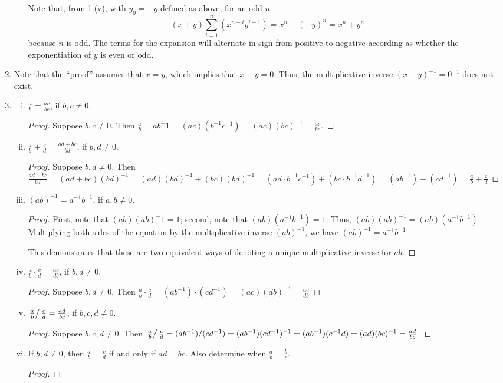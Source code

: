 \documentclass{amsart}
\begin{document}
\begin{enumerate}[1.]
\begin{enumerate}[(i)]
   Note that, from 1.(v), with $y_0=-y$ defined as above, for an odd $n$ $$(x+y)\sum_{i=1}^{n}(x^{n-i}y^{i-1})=x^n-(-y)^{n}=x^n+y^n$$ because $n$ is odd. The terms for the expansion will alternate in sign from positive to negative according as whether the exponentiation of $y$ is even or odd.
 \end{enumerate}
\item Note that the ``proof'' assumes that $x=y$, which implies that $x-y=0$. Thus, the multiplicative inverse $(x-y)^{-1}=0^{-1}$ does not exist.
\item
  \begin{enumerate}[(i)]
  \item  $ \frac{a}{b}=\frac{ac}{bc}$, if $b,c \neq 0$.
    \begin{proof}
      Suppose $b,c \neq 0$. Then $\frac{a}{b}=ab^-1=(ac)(b^{-1}c^{-1})=(ac)(bc)^{-1}=\frac{ac}{bc}$.
    \end{proof}
  \item $\frac{a}{b}+\frac{c}{d}=\frac{ad+bc}{bd}$, if $b,d \neq 0$.
  \begin{proof}
    Suppose $b,d\neq0$. Then $\frac{ad+bc}{bd}=(ad+bc)(bd)^{-1}=(ad)(bd)^{-1}+(bc)(bd)^{-1}=(ad \cdot b^{-1}c^{-1}) + (bc \cdot b^{-1}d^{-1})=(ab^{-1})+(cd^{-1})=\frac{a}{b}+\frac{c}{d}$
  \end{proof}
\item $(ab)^{-1}=a^{-1}b^{-1}$, if $a,b \neq 0$.
  \begin{proof}
    First, note that $(ab)(ab)^-1=1$; second, note that $(ab)(a^{-1}b^{-1})=1$. Thus, $(ab)(ab)^{-1}=(ab)(a^{-1}b^{-1})$. Multiplying both sides of the equation by the multiplicative inverse $(ab)^{-1}$, we have $(ab)^{-1}=a^{-1}b^{-1}$.

    This demonstrates that these are two equivalent ways of denoting a unique multiplicative inverse for $ab$.
  \end{proof}
\item $\frac{a}{b} \cdot \frac{c}{d}=\frac{ac}{db}$, if $b,d \neq 0$.
  \begin{proof}
    Suppose $b, d \neq 0$. Then $\frac{a}{b} \cdot \frac{c}{d}=(ab^{-1}) \cdot (cd^{-1})=(ac)(db)^{-1}=\frac{ac}{db}$
  \end{proof}
\item $\left. \frac{a}{b} \right/ \frac{c}{d}=\frac{ad}{bc}$, if $b, c, d \neq 0$.
  \begin{proof}
    Suppose $b,c,d \neq 0$. Then $\left. \frac{a}{b} \right/ \frac{c}{d}=(ab^{-1})/(cd^{-1})=(ab^{-1})(cd^{-1})^{-1}=(ab^{-1})(c^{-1}d)=(ad)(bc)^{-1}=\frac{ad}{bc}$.
  \end{proof}
\item If $b,d \neq 0$, then $\frac{a}{b}=\frac{c}{d}$ if and only if $ad=bc$. Also determine when $\frac{a}{b}=\frac{b}{c}$.
  \begin{proof}
    

\end{proof}
\end{enumerate}
\end{enumerate}
\end{document}
